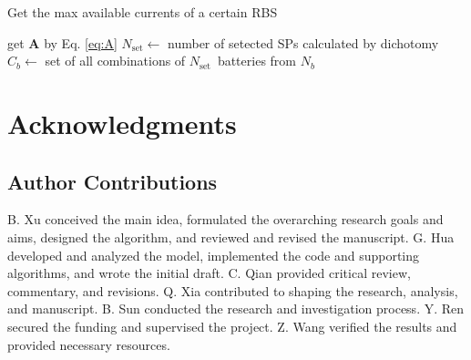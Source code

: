 \documentclass{article}
\begin{document}
\begin{algorithm}
    \caption{Get the max available currents of a certain RBS}\label{alg:greedy}
    \KwResult{$\max \eta$}
    get $\bm{A}$ by Eq. \ref{eq:A}\;
    {
        $N_{\text{set}} \leftarrow$ number of setected SPs calculated by dichotomy\;
        $C_b    \leftarrow$ set of all combinations of $N_{\text{set}} $~batteries from $N_b$\;
    }
\end{algorithm}


\section*{Acknowledgments}

\subsection*{Author Contributions} 

B. Xu conceived the main idea, formulated the overarching research goals and aims, designed the algorithm, and reviewed and revised the manuscript.
G. Hua developed and analyzed the model, implemented the code and supporting algorithms, and wrote the initial draft.
C. Qian provided critical review, commentary, and revisions.
Q. Xia contributed to shaping the research, analysis, and manuscript.
B. Sun conducted the research and investigation process.
Y. Ren secured the funding and supervised the project.
Z. Wang verified the results and provided necessary resources.
\end{document}

